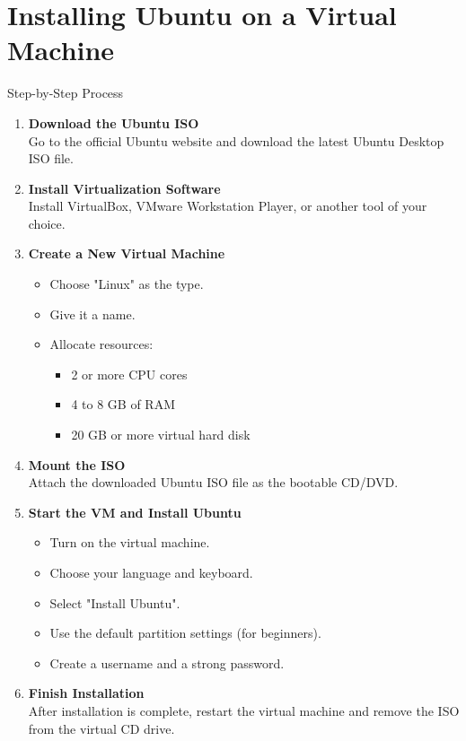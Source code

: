 \section{Installing Ubuntu on a Virtual Machine}
Step-by-Step Process
\begin{enumerate}
    \item \textbf{Download the Ubuntu ISO}\\
    Go to the official Ubuntu website and download the latest Ubuntu Desktop ISO file.
    \item \textbf{Install Virtualization Software}\\
    Install VirtualBox, VMware Workstation Player, or another tool of your choice.
    \item \textbf{Create a New Virtual Machine}
    \begin{itemize}
        \item Choose "Linux" as the type.
        \item Give it a name.
        \item Allocate resources:
        \begin{itemize}
            \item 2 or more CPU cores
            \item 4 to 8 GB of RAM
            \item 20 GB or more virtual hard disk
        \end{itemize}
    \end{itemize}
    \item \textbf{Mount the ISO}\\
    Attach the downloaded Ubuntu ISO file as the bootable CD/DVD.
    \item \textbf{Start the VM and Install Ubuntu}
    \begin{itemize}
        \item Turn on the virtual machine.
        \item Choose your language and keyboard.
        \item Select "Install Ubuntu".
        \item Use the default partition settings (for beginners).
        \item Create a username and a strong password.
    \end{itemize}
    \item \textbf{Finish Installation}\\
    After installation is complete, restart the virtual machine and remove the ISO from the virtual CD drive.
\end{enumerate}

